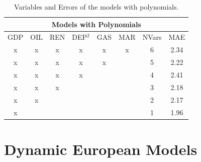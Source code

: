 \documentclass[a4paper,12pt]{book}
\begin{document}
\begin{table}[tb]
\begin{center}
\begin{tabular}{|c|c|c|c|c|c|c|c|}
\hline
\multicolumn{8}{|c|}{Models with Polynomials}\\
\hline
GDP&OIL&REN&DEP$^2$&GAS&MAR&NVars&MAE\\
\hline
x&x&x&x&x&x&6&2.34\\
x&x&x&x&x&&5&2.22\\
x&x&x&x&&&4&2.41\\
x&x&x&&&&3&2.18\\
x&x&&&&&2&2.17\\
x&&&&&&1&1.96\\
\hline
\end{tabular}
\caption{Variables and Errors of the models with polynomials.}
\label{Tab:poly}
\end{center}
\end{table}

\section{Dynamic European Models}
\end{document}
